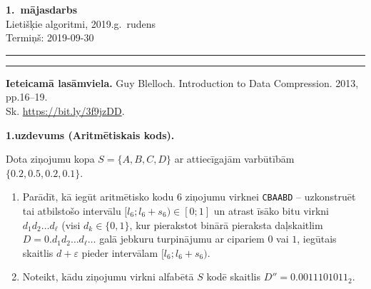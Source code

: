 \documentclass[a4paper,12pt]{article}
\begin{document}
\thispagestyle{empty}

\begin{center}
{\bf\Huge 1.\ mājasdarbs} \\[5pt]
Lietišķie algoritmi, 2019.g.\ rudens\\
Termiņš: 2019-09-30
\end{center}

\hrule
\vspace{2pt}
\hrule
\vspace{12pt}


{\bf Ieteicamā lasāmviela.} Guy Blelloch. Introduction to Data Compression. 2013, pp.16--19.\\
Sk. \url{https://bit.ly/3f9jzDD}.


\vspace{10pt}
{\bf 1.uzdevums (Aritmētiskais kods).}

Dota ziņojumu kopa $S = \{ A,B,C,D \}$ ar attiecīgajām varbūtībām 
$\{ 0.2, 0.5, 0.2, 0.1 \}$.
\begin{enumerate}[label=(\alph*)]
\item Parādīt, kā iegūt aritmētisko kodu $6$ ziņojumu virknei {\tt CBAABD} -- uzkonstruēt
tai atbilstošo intervālu $[l_6;l_6+s_6) \in [0;1]$ un atrast 
īsāko bitu virkni $d_1d_2\ldots{}d_{\ell}$ (visi $d_k \in \{ 0,1 \}$, 
kur pierakstot binārā pieraksta daļskaitlim $D = 0.d_1d_2\ldots{}d_{\ell}\ldots$ 
galā jebkuru turpinājumu ar cipariem $0$ vai $1$, iegūtais skaitlis $d+\varepsilon$ pieder
intervālam $[l_6;l_6+s_6)$.
\item Noteikt, kādu ziņojumu virkni alfabētā $S$ kodē skaitlis 
$D'' = 0.0011101011_2$.
\end{enumerate}
\end{document}

